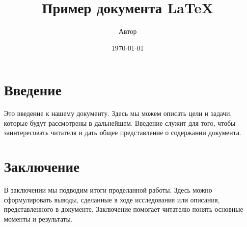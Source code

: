 \documentclass{article}
\title{Пример документа LaTeX}
\author{Автор}
\date{\today}
\begin{document}
\maketitle

\section{Введение}
Это введение к нашему документу. Здесь мы можем описать цели и задачи, которые будут рассмотрены в дальнейшем. Введение служит для того, чтобы заинтересовать читателя и дать общее представление о содержании документа.

\section{Заключение}
В заключении мы подводим итоги проделанной работы. Здесь можно сформулировать выводы, сделанные в ходе исследования или описания, представленного в документе. Заключение помогает читателю понять основные моменты и результаты.
\end{document}
